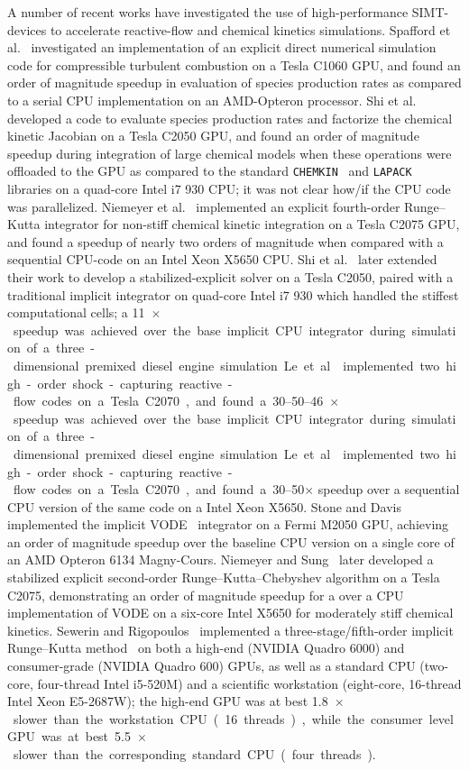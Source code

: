 \documentclass[12pt,number,sort&compress,preprint]{elsarticle}
\begin{document}
A number of recent works have investigated the use of high-performance SIMT-devices to accelerate reactive-flow and chemical kinetics simulations.
Spafford et al.~\cite{Spafford:2010aa} investigated an implementation of an explicit direct numerical simulation code for compressible turbulent combustion on a Tesla C1060 GPU, and found an order of magnitude speedup in evaluation of species production rates as compared to a serial CPU implementation on an AMD-Opteron processor.
Shi et al.~\cite{Shi:2011aa} developed a code to evaluate species production rates and factorize the chemical kinetic Jacobian on a Tesla C2050 GPU, and found an order of magnitude speedup during integration of large chemical models when these operations were offloaded to the GPU as compared to the standard \texttt{CHEMKIN}~\cite{kee1989chemkin} and \texttt{LAPACK}~\cite{Anderson:1999aa} libraries on a quad-core Intel i7 930 CPU; it was not clear how\slash if the CPU code was parallelized.
Niemeyer et al.~\cite{Niemeyer:2011aa} implemented an explicit fourth-order Runge--Kutta integrator for non-stiff chemical kinetic integration on a Tesla C2075 GPU, and found a speedup of nearly two orders of magnitude when compared with a sequential CPU-code on an Intel Xeon X5650 CPU.
Shi et al.~\cite{Shi:2012aa} later extended their work to develop a stabilized-explicit solver on a Tesla C2050, paired with a traditional implicit integrator on quad-core Intel i7 930 which handled the stiffest computational cells; a \SIrange{11}{46}{$\times$} speedup was achieved over the base implicit CPU integrator during simulation of a three-dimensional premixed diesel engine simulation.
Le et al.~\cite{Le2013596} implemented two high-order shock-capturing reactive-flow codes on a Tesla C2070, and found a \numrange{30}{50}$\times$ speedup over a sequential CPU version of the same code on a Intel Xeon X5650.
Stone and Davis~\cite{Stone:2013aa} implemented the implicit VODE~\cite{Brown:1989vl} integrator on a Fermi M2050 GPU, achieving an order of magnitude speedup over the baseline CPU version on a single core of an AMD Opteron 6134 Magny-Cours.
Niemeyer and Sung~\cite{Niemeyer:2014aa} later developed a stabilized explicit second-order Runge--Kutta--Chebyshev algorithm on a Tesla C2075, demonstrating an order of magnitude speedup for a over a CPU implementation of VODE on a six-core Intel X5650 for moderately stiff chemical kinetics.
Sewerin and Rigopoulos~\cite{Sewerin20151375} implemented a three-stage\slash fifth-order implicit Runge--Kutta method~\cite{wanner1991solving} on both a high-end (NVIDIA Quadro 6000) and consumer-grade (NVIDIA Quadro 600) GPUs, as well as a standard CPU (two-core, four-thread Intel i5-520M) and a scientific workstation (eight-core, 16-thread Intel Xeon E5-2687W); the high-end GPU was at best \SI{1.8}{$\times$} slower than the workstation CPU (16 threads), while the consumer level GPU was at best \SI{5.5}{$\times$} slower than the corresponding standard CPU (four threads).
\end{document}
